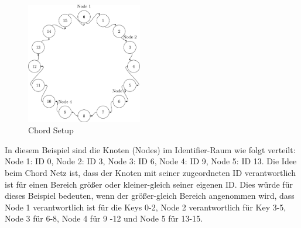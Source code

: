 \begin{figure}[!ht]
  \centering
  \includegraphics[width=0.45\textwidth]{fig/tex-grapics/chord.pdf.png}
  \caption{Chord Setup}
  \label{fig:chord}
\end{figure}

In diesem Beispiel sind die Knoten (Nodes) im Identifier-Raum wie folgt verteilt: Node 1: ID 0, Node 2: ID 3, Node 3: ID 6, Node 4: ID 9, Node 5: ID 13. Die Idee beim Chord Netz ist, dass der Knoten mit seiner zugeordneten ID verantwortlich ist für einen Bereich größer oder kleiner-gleich seiner eigenen ID. Dies würde für dieses Beispiel bedeuten, wenn der größer-gleich Bereich angenommen wird, dass Node 1 verantwortlich ist für die Keys 0-2, Node 2 verantwortlich für Key 3-5, Node 3 für 6-8, Node 4 für 9 -12 und Node 5 für 13-15. 

